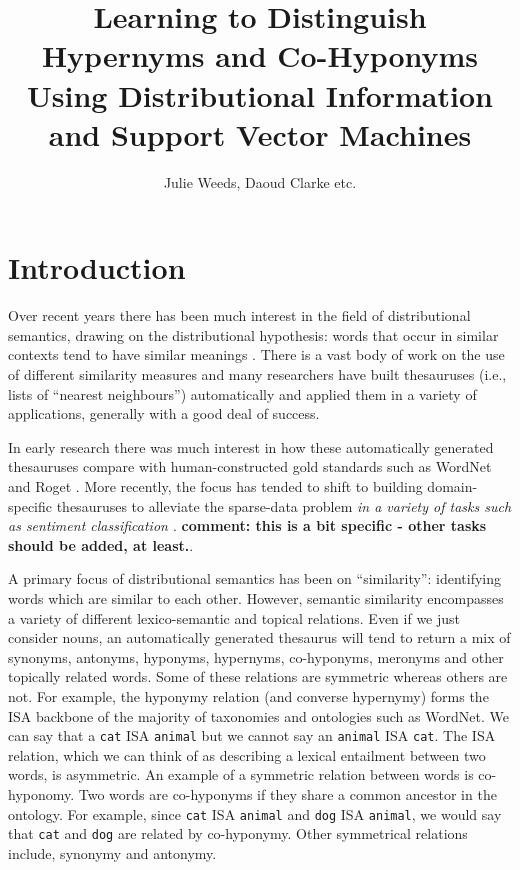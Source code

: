 \documentclass[11pt]{article}
\title{Learning to Distinguish Hypernyms and Co-Hyponyms Using Distributional Information and Support Vector Machines}
\author{Julie Weeds, Daoud Clarke etc.}
\date{} %
\begin{document}
\maketitle

\begin{abstract}
\end{abstract}
\section{Introduction}

Over recent years there has been much interest in the field of distributional semantics, drawing on the distributional hypothesis: words that occur in similar contexts tend to have similar meanings \cite{Harris1954}.   There is a vast body of work on the use of different similarity measures \cite{Lee1999,Weeds2003,Curran2004} and many researchers have built thesauruses (i.e., lists of ``nearest neighbours'') automatically and applied them in a variety of applications, generally with a good deal of success.

In early research there was much interest in how these automatically generated thesauruses compare with human-constructed gold standards such as WordNet and Roget \cite{Lin1998,Kilgarriff2000}.  More recently, the focus has tended to shift to building domain-specific thesauruses to alleviate the sparse-data problem {\em in a variety of tasks such as sentiment classification \cite{Bollegala2011}\/}. {\bf comment: this is a bit specific - other tasks should be added, at least.}.  

A primary focus of distributional semantics has been on ``similarity'': identifying words which are similar to each other. However, semantic similarity encompasses a variety of different lexico-semantic and topical relations.  Even if we just consider nouns, an automatically generated thesaurus will tend to return a mix of synonyms, antonyms, hyponyms, hypernyms, co-hyponyms, meronyms and other topically related words.  Some of these relations are symmetric whereas others are not.  For example, the hyponymy relation (and converse hypernymy) forms the ISA backbone of the majority of taxonomies and ontologies such as WordNet.  We can say that a \texttt{cat} ISA \texttt{animal}  but we cannot say an \texttt{animal} ISA \texttt{cat}.  The ISA relation, which we can think of  as describing a lexical entailment\cite{Geffet2005}  between two words, is asymmetric. An example of a symmetric relation between words is co-hyponomy. Two words are co-hyponyms if they share a common ancestor in the ontology. 
For example, since \texttt{cat} ISA \texttt{animal} and \texttt{dog} ISA \texttt{animal}, we would say that \texttt{cat} and \texttt{dog} are related by co-hyponymy.  Other symmetrical relations include, synonymy and antonymy. 
\end{document}
